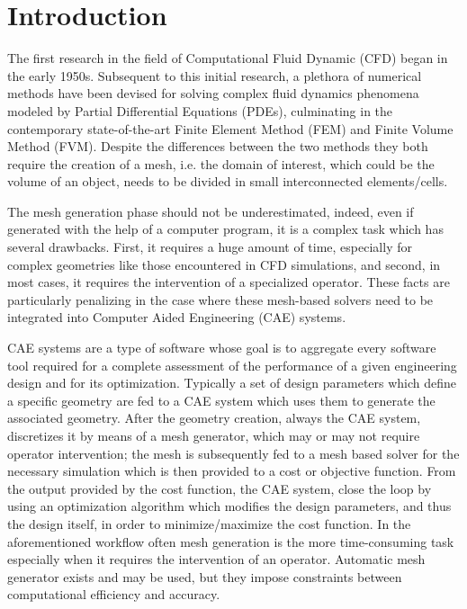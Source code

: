 \chapter{Introduction}

The first research in the field of Computational Fluid Dynamic (CFD) began in the early 1950s. Subsequent to this initial research, a plethora of numerical methods have been devised for solving complex fluid dynamics phenomena modeled by Partial Differential Equations (PDEs), culminating in the contemporary state-of-the-art Finite Element Method (FEM) and Finite Volume Method (FVM). Despite the differences between the two methods they both require the creation of a mesh, i.e. the domain of interest, which could be the volume of an object, needs to be divided in small interconnected elements/cells. 

The mesh generation phase should not be underestimated, indeed, even if generated with the help of a computer program, it is a complex task which has several drawbacks. First, it requires a huge amount of time, especially for complex geometries like those encountered in CFD simulations, and second, in most cases, it requires the intervention of a specialized operator. These facts are particularly penalizing in the case where these mesh-based solvers need to be integrated into Computer Aided Engineering (CAE) systems.

\medskip
CAE systems are a type of software whose goal is to aggregate every software tool required for a complete assessment of the performance of a given engineering design and for its optimization. Typically a set of design parameters which define a specific geometry are fed to a CAE system which uses them to generate the associated geometry. After the geometry creation, always the CAE system, discretizes it by means of a mesh generator, which may or may not require operator intervention; the mesh is subsequently fed to a mesh based solver for the necessary simulation which is then provided to a cost or objective function. From the output provided by the cost function, the CAE system, close the loop by using an optimization algorithm which modifies the design parameters, and thus the design itself, in order to minimize/maximize the cost function. In the aforementioned workflow often mesh generation is the more time-consuming task especially when it requires the intervention of an operator.
Automatic mesh generator exists and may be used, but they impose constraints between computational efficiency and accuracy.

